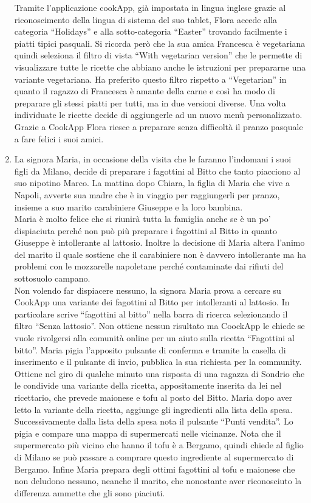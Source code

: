 \begin{enumerate}
Tramite l'applicazione
cookApp, già impostata in lingua inglese grazie al riconoscimento della lingua
di sistema del suo tablet, Flora accede alla categoria ``Holidays'' e alla
sotto-categoria ``Easter'' trovando facilmente i piatti tipici pasquali. 
Si ricorda però che la sua amica Francesca è vegetariana quindi
seleziona il filtro di vista ``With vegetarian version'' che le permette
di visualizzare tutte le ricette che abbiano anche le istruzioni per
prepararne una variante vegetariana. Ha preferito questo filtro rispetto
a ``Vegetarian'' in quanto il ragazzo di Francesca è amante della carne e
così ha modo di preparare gli stessi piatti per tutti, ma in due versioni
diverse. Una volta individuate le ricette decide di aggiungerle ad un
nuovo menù personalizzato.\\
Grazie a CookApp Flora riesce a preparare senza difficoltà
il pranzo pasquale a fare felici i suoi amici.


\item La signora Maria, in occasione della visita che le faranno
l'indomani i suoi figli da Milano, decide di preparare i fagottini al
Bitto che tanto piacciono al suo nipotino Marco. La mattina dopo Chiara, la
figlia di Maria che vive a Napoli, avverte sua madre che è in viaggio
per raggiungerli per pranzo,
insieme a suo marito carabiniere Giuseppe e la loro bambina.\\ 
Maria è molto
felice che si riunirà tutta la famiglia anche se è un po' dispiaciuta
perché non può più preparare i fagottini al Bitto in quanto Giuseppe è
intollerante al lattosio. Inoltre la decisione di Maria
altera l'animo del marito il quale sostiene che il carabiniere non è
davvero intollerante ma ha problemi con le mozzarelle napoletane perché
contaminate dai rifiuti del sottosuolo campano.\\
Non volendo far
dispiacere nessuno, la signora Maria prova a cercare su CookApp una
variante dei fagottini al Bitto per intolleranti al lattosio. In
particolare scrive ``fagottini al bitto'' nella barra di ricerca
selezionando il filtro ``Senza lattosio''. Non ottiene nessun risultato
ma CoockApp le chiede se vuole rivolgersi alla comunità online per un
aiuto sulla ricetta ``Fagottini al bitto''. Maria pigia l'apposito
pulsante di conferma e tramite la casella di inserimento e il pulsante
di invio, pubblica la sua richiesta per la community. Ottiene nel giro
di qualche minuto una risposta di una ragazza di Sondrio che le
condivide una variante della ricetta, appositamente inserita da lei nel
ricettario, che prevede maionese e tofu al posto del Bitto. Maria
dopo aver letto la variante della ricetta, aggiunge gli ingredienti alla
lista della spesa. Successivamente dalla lista della spesa nota il
pulsante ``Punti vendita''. Lo pigia e compare una mappa di
supermercati nelle vicinanze. Nota che il supermercato più vicino che
hanno il tofu è a Bergamo, quindi chiede al figlio di Milano se può
passare a comprare questo ingrediente al supermercato di Bergamo. Infine
Maria prepara degli ottimi fagottini al tofu e maionese che non deludono
nessuno, neanche il marito, che nonostante aver riconosciuto la
differenza ammette che gli sono piaciuti.

\end{enumerate}
